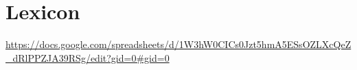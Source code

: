 \section{Lexicon}
\url{https://docs.google.com/spreadsheets/d/1W3hW0CICs0Jzt5hmA5ESsOZLXcQeZ_dRlPPZJA39RSg/edit?gid=0#gid=0}

\begin{multicols}{2}
\begin{hangparas}{1em}{1}



\end{hangparas}
\end{multicols}